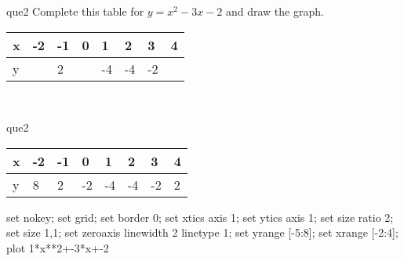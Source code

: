 \documentclass[13.5pt, varwidth=true]{beamer}
\begin{document}
\begin{frame}[shrink=19,fragile]
	\begin{beamercolorbox}[rounded=true, left, shadow=true,wd=14.8cm]{que2}
		 Complete this table for $y = x^{2} - 3x - 2$ and draw the graph. \\[0.3cm] \renewcommand{\arraystretch}{1.2}\begin{tabular}{|C|C|C|C|C|C|C|C|} \hline x & -2 & -1 & 0 & 1 & 2 & 3 & 4 \\ \hline y &  & 2 &  & -4 & -4 & -2 & \\ \hline \end{tabular}\\[0.3cm]
	\end{beamercolorbox}
\end{frame}
\begin{frame}[shrink=19,fragile]
	\begin{beamercolorbox}[rounded=true, left, shadow=true,wd=14.8cm]{que2}
		\renewcommand{\arraystretch}{1.2}\begin{tabular}{|C|C|C|C|C|C|C|C|} \hline x & -2 & -1 & 0 & 1 & 2 & 3 & 4 \\ \hline y & 8 & 2 & -2 & -4 & -4 & -2 & 2\\ \hline \end{tabular}\begin{gnuplot}[terminal=pdf] set nokey; set grid; set border 0; set xtics axis 1; set ytics axis 1; set size ratio 2; set size 1,1; set zeroaxis linewidth 2 linetype 1; set yrange [-5:8]; set xrange [-2:4]; plot 1*x**2+-3*x+-2 \end{gnuplot}
	\end{beamercolorbox}
\end{frame}
\end{document}
